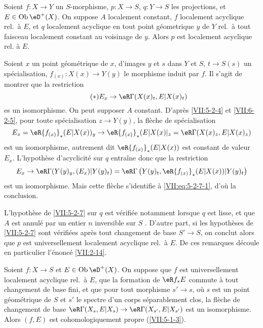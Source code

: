 \begin{corollary}\label{VII:5-2-7}
Soient $f:X\to Y$ un $S$-morphisme, $p:X\to S$, $q:Y\to S$ les projections, et 
$E\in\ob\eD^+(X)$. On suppose $A$ localement constant, $f$ localement acyclique 
rel.\ \`a $E$, et $q$ localement acyclique en tout point g\'eometrique $y$ de 
$Y$ rel.\ \`a tout faisceau localement constant au voisinage de $y$. Alors $p$ 
est localement acyclique rel. \`a $E$. 
\end{corollary}

Soient $x$ un point g\'eom\'etrique de $x$, d'images $y$ et $s$ dans $Y$ et 
$S$, $t\to S(s)$ un sp\'ecialisation, $f_{(x)}:X(x)\to Y(y)$ le morphisme 
induit par $f$. Il s'agit de montrer que la restriction 
\begin{equation*}\tag{$*$}\label{VII:eq:5-2-7-1}
  E_x \to \eR\Gamma(X(x)_t,E|X(x)_t) 
\end{equation*}
es un isomorphisme. On peut supposer $A$ constant. D'apr\`es \ref{VII:5-2-4} et 
\ref{VII:6-2-5}, pour toute sp\'ecialisation $z\to Y(y)$, la fl\`eche de 
sp\'ecialisation 
\[
  E_x = \eR {f_{(x)}}_\ast (E|X(x))_y \to \eR {f_{(x)}}_\ast (E|X(x)|_z = \eR\Gamma(X(x)_z,E|X(x)_z) 
\]
est un isomorphisme, autrement dit $\eR{f_{(x)}}_\ast(E|X(x))$ est constant de 
valeur $E_x$. L'hypoth\`ese d'acyclicit\'e sur $q$ entra\^ine donc que la 
restriction 
\[
  E_x \to \eR\Gamma(Y(y)_y,(E_x)|Y(y)_t) = \eR\Gamma\left(Y(y)_t,\eR {f_{(x)}}_\ast (E|X(x))|Y(y)_t\right)
\]
est un isomorphisme. Mais cette fl\`eche s'identifie \`a 
\eqref{VII:eq:5-2-7-1}, d'o\`u la conclusion. 

L'hypoth\`ese de \ref{VII:5-2-7} sur $q$ est v\'erifi\'ee notamment lorsque $q$ 
est lisse, et que $A$ est annul\'e par un entier $n$ inversible sur $S$ 
\cite[XV]{sga4}. D'autre part, si les hypoth\`eses de \ref{VII:5-2-7} sont 
v\'erifi\'ees apr\`es tout changement de base $S'\to S$, on conclut alors que 
$p$ est universellement localement acyclique rel.\ \`a $E$. De ces remarques 
d\'ecoule en particulier l'\'enonc\'e \ref{VII:2-14}. 





\begin{corollary}\label{VII:5-2-8}
Soient $f:X\to S$ et $E\in \ob\eD^+(X)$. On suppose que $f$ est universellement 
localement acyclique rel.\ \`a $E$, que la formation de $\eR f_\ast E$ commute 
\`a tout changement de base fini, et que pour tout morphisme $s'\to s$, o\`u 
$s$ est un point g\'eom\'etrique de $S$ et $s'$ le spectre d'un corps 
s\'eparablement clos, la fl\`eche de changement de base 
$\eR\Gamma(X_s,E|X_s)\to \eR\Gamma(X_{s'},E|X_{s'})$ est un isomorphisme. 
Alors $(f,E)$ est cohomologiquement propre (\ref{VII:5-1-3}). 
\end{corollary}

